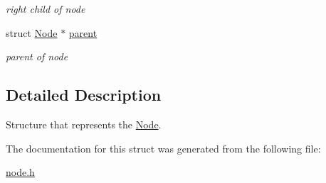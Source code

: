 \begin{DoxyCompactItemize}
\begin{DoxyCompactList}\small\item\em right child of node \end{DoxyCompactList}\item 
struct \hyperlink{structNode}{Node} $\ast$ \hyperlink{structNode_a34f3ab9670c7b70dad8905359a243c92}{parent}\hypertarget{structNode_a34f3ab9670c7b70dad8905359a243c92}{}\label{structNode_a34f3ab9670c7b70dad8905359a243c92}

\begin{DoxyCompactList}\small\item\em parent of node \end{DoxyCompactList}\end{DoxyCompactItemize}


\subsection{Detailed Description}
Structure that represents the \hyperlink{structNode}{Node}. 

The documentation for this struct was generated from the following file\+:\begin{DoxyCompactItemize}
\item 
\hyperlink{node_8h}{node.\+h}\end{DoxyCompactItemize}

